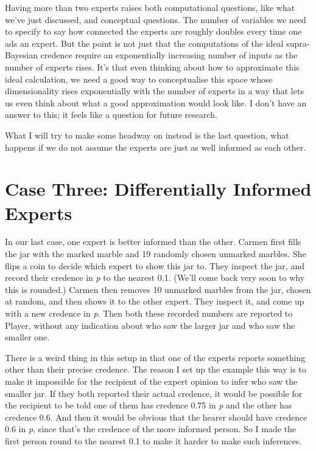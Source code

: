 \documentclass[
  11pt,
  letterpaper,
  DIV=11,
  numbers=noendperiod,
  twoside]{scrartcl}
\begin{document}
Having more than two experts raises both computational questions, like
what we've just discussed, and conceptual questions. The number of
variables we need to specify to say how connected the experts are
roughly doubles every time one ads an expert. But the point is not just
that the computations of the ideal supra-Bayesian credence require an
exponentially increasing number of inputs as the number of experts
rises. It's that even thinking about how to approximate this ideal
calculation, we need a good way to conceptualise this space whose
dimensionality rises exponentially with the number of experts in a way
that lets us even think about what a good approximation would look like.
I don't have an answer to this; it feels like a question for future
research.

What I will try to make some headway on instead is the last question,
what happens if we do not assume the experts are just as well informed
as each other.

\section{Case Three: Differentially Informed
Experts}\label{case-three-differentially-informed-experts}

In our last case, one expert is better informed than the other. Carmen
first fills the jar with the marked marble and 19 randomly chosen
unmarked marbles. She flips a coin to decide which expert to show this
jar to. They inspect the jar, and record their credence in \emph{p} to
the nearest 0.1. (We'll come back very soon to why this is rounded.)
Carmen then removes 10 unmarked marbles from the jar, chosen at random,
and then shows it to the other expert. They inspect it, and come up with
a new credence in \emph{p}. Then both these recorded numbers are
reported to Player, without any indication about who saw the larger jar
and who saw the smaller one.

There is a weird thing in this setup in that one of the experts reports
something other than their precise credence. The reason I set up the
example this way is to make it impossible for the recipient of the
expert opinion to infer who saw the smaller jar. If they both reported
their actual credence, it would be possible for the recipient to be told
one of them has credence 0.75 in \emph{p} and the other has credence
0.6. And then it would be obvious that the hearer should have credence
0.6 in \emph{p}, since that's the credence of the more informed person.
So I made the first person round to the nearest 0.1 to make it harder to
make such inferences.
\end{document}
